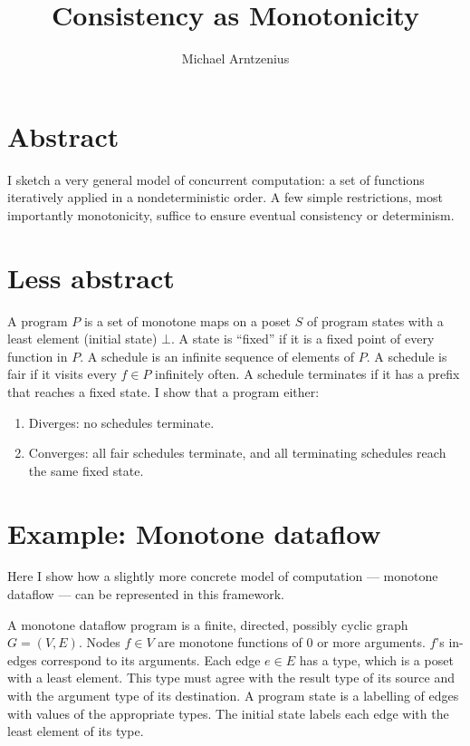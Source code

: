 \documentclass{article}
\begin{document}
\title{Consistency as Monotonicity}
\author{Michael Arntzenius}
\date{}
\maketitle


\section{Abstract}

I sketch a very general model of concurrent computation: a set of functions
iteratively applied in a nondeterministic order. A few simple restrictions, most
importantly monotonicity, suffice to ensure eventual consistency or determinism.


\section{Less abstract}
\label{sec:less-abstract}

A program $P$ is a set of monotone maps on a poset $S$ of program states
with a least element (initial state) $\bot$. A state is ``fixed'' if it is a
fixed point of every function in $P$. A schedule is an infinite sequence of
elements of $P$. A schedule is fair if it visits every $f \in P$ infinitely
often. A schedule terminates if it has a prefix that reaches a fixed state. I
show that a program either:

\begin{enumerate}
\item Diverges: no schedules terminate.
\item Converges: all fair schedules terminate, and all terminating schedules
  reach the same fixed state.
\end{enumerate}


\section{Example: Monotone dataflow}

Here I show how a slightly more concrete model of computation --- monotone
dataflow --- can be represented in this framework.

A monotone dataflow program is a finite, directed, possibly cyclic graph $G =
(V,E)$. Nodes $f \in V$ are monotone functions of 0 or more arguments. $f$'s
in-edges correspond to its arguments. Each edge $e \in E$ has a type, which is a
poset with a least element. This type must agree with the result type of its
source and with the argument type of its destination. A program state is a
labelling of edges with values of the appropriate types. The initial state
labels each edge with the least element of its type.
\end{document}
